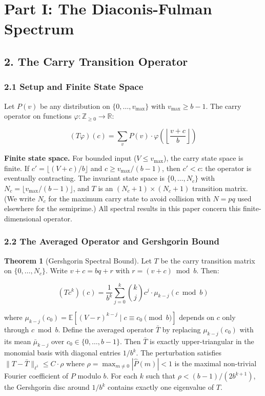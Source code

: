 \documentclass[
  11pt,
]{article}
\begin{document}
\section{Part I: The Diaconis-Fulman
Spectrum}\label{part-i-the-diaconis-fulman-spectrum}

\newpage

\subsection{2. The Carry Transition
Operator}\label{the-carry-transition-operator}

\subsubsection{2.1 Setup and Finite State
Space}\label{setup-and-finite-state-space}

Let \(P(v)\) be any distribution on \(\lbrace{}0, \ldots, v_{\max}\rbrace{}\)
with \(v_{\max} \geq b-1\). The carry operator on functions
\(\varphi: \mathbb{Z}_{\geq 0} \to \mathbb{R}\):

\[(T\varphi)(c) = \sum_v P(v) \cdot \varphi\!\left(\left\lfloor \frac{v+c}{b}\right\rfloor\right)\]

\textbf{Finite state space.} For bounded input (\(V \leq v_{\max}\)), the carry
state space is finite. If \(c' = \lfloor(V+c)/b\rfloor\) and
\(c \geq v_{\max}/(b-1)\), then \(c' < c\): the operator is eventually
contracting. The invariant state space is \(\lbrace{}0, \ldots, N_c\rbrace{}\)
with \(N_c = \lfloor v_{\max}/(b-1) \rfloor\), and \(T\) is an
\((N_c+1) \times (N_c+1)\) transition matrix. (We write \(N_c\) for the maximum
carry state to avoid collision with \(N = pq\) used elsewhere for the
semiprime.) All spectral results in this paper concern this finite-dimensional
operator.

\subsubsection{2.2 The Averaged Operator and Gershgorin
Bound}\label{the-averaged-operator-and-gershgorin-bound}

\textbf{Theorem 1} (Gershgorin Spectral Bound). Let \(T\) be the carry
transition matrix on \(\lbrace{}0, \ldots, N_c\rbrace{}\). Write
\(v + c = bq + r\) with \(r = (v+c) \bmod b\). Then:

\[(Tc^k)(c) = \frac{1}{b^k}\sum_{j=0}^k \binom{k}{j} c^j \cdot \mu_{k-j}(c \bmod b)\]

where \(\mu_{k-j}(c_0) = \mathbb{E}[(V - r)^{k-j} \mid c \equiv c_0 \pmod{b}]\)
depends on \(c\) only through \(c \bmod b\). Define the averaged operator
\(\bar{T}\) by replacing \(\mu_{k-j}(c_0)\) with its mean \(\bar{\mu}_{k-j}\)
over \(c_0 \in \lbrace{}0, \ldots, b-1\rbrace{}\). Then \(\bar{T}\) is exactly
upper-triangular in the monomial basis with diagonal entries \(1/b^k\). The
perturbation satisfies \(\|T - \bar{T}\|_{\ell^1} \leq C \cdot \rho\) where
\(\rho = \max_{m \neq 0}|\hat{P}(m)| < 1\) is the maximal non-trivial Fourier
coefficient of \(P\) modulo \(b\). For each \(k\) such that
\(\rho < (b-1)/(2b^{k+1})\), the Gershgorin disc around \(1/b^k\) contains
exactly one eigenvalue of \(T\).
\end{document}
